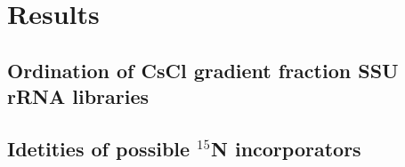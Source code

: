 \section{Results}
\subsection{Ordination of CsCl gradient fraction SSU rRNA libraries}
\subsection{Idetities of possible $^{15}$N incorporators}


